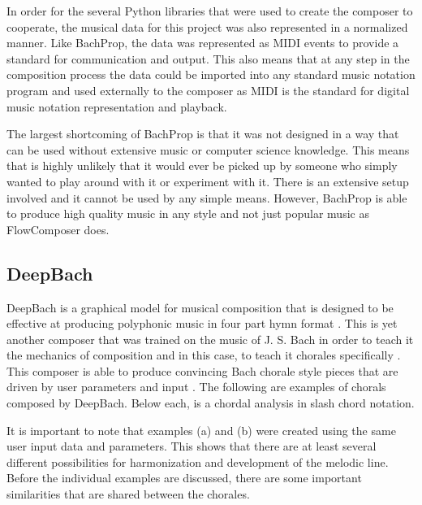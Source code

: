 \vspace{\baselineskip}

In order for the several Python libraries that were used to create the composer to cooperate, the musical data for this project was also represented in a normalized manner.  Like BachProp, the data was represented as MIDI events to provide a standard for communication and output.  This also means that at any step in the composition process the data could be imported into any standard music notation program and used externally to the composer as MIDI is the standard for digital music notation representation and playback.

\vspace{\baselineskip}

The largest shortcoming of BachProp is that it was not designed in a way that can be used without extensive music or computer science knowledge.  This means that is highly unlikely that it would ever be picked up by someone who simply wanted to play around with it or experiment with it.  There is an extensive setup involved and it cannot be used by any simple means.  However, BachProp is able to produce high quality music in any style and not just popular music as FlowComposer does.

\subsection{DeepBach}
\label{subsec:deepbach}

DeepBach is a graphical model for musical composition that is designed to be effective at producing polyphonic music in four part hymn format \cite{Hadjeres_2016}.  This is yet another composer that was trained on the music of J. S. Bach in order to teach it the mechanics of composition and in this case, to teach it chorales specifically \cite{Hadjeres_2016}.  This composer is able to produce convincing Bach chorale style pieces that are driven by user parameters and input \cite{Hadjeres_2016}.  The following are examples of chorals composed by DeepBach.  Below each, is a chordal analysis in slash chord notation.

\pagebreak

It is important to note that examples (a) and (b) were created using the same user input data and parameters.  This shows that there are at least several different possibilities for harmonization and development of the melodic line.  Before the individual examples are discussed, there are some important similarities that are shared between the chorales.

